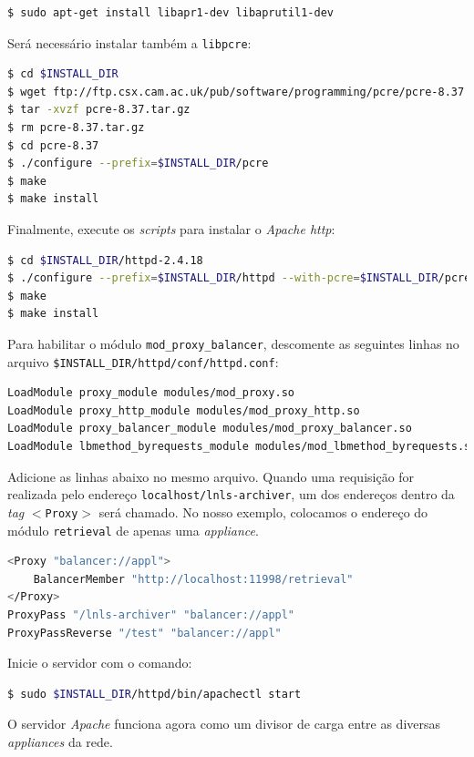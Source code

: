 \begin {enumerate}[i.]
\begin{lstlisting}[language=bash, style=nonumbers]
$ sudo apt-get install libapr1-dev libaprutil1-dev
\end{lstlisting}

Será necessário instalar também a \texttt{libpcre}:

\begin{lstlisting}[language=bash, style=nonumbers]
$ cd $INSTALL_DIR
$ wget ftp://ftp.csx.cam.ac.uk/pub/software/programming/pcre/pcre-8.37.tar.gz
$ tar -xvzf pcre-8.37.tar.gz
$ rm pcre-8.37.tar.gz
$ cd pcre-8.37
$ ./configure --prefix=$INSTALL_DIR/pcre
$ make
$ make install
\end{lstlisting}

Finalmente, execute os \textit{scripts} para instalar o \textit{Apache http}:

\begin{lstlisting}[language=bash, style=nonumbers]
$ cd $INSTALL_DIR/httpd-2.4.18
$ ./configure --prefix=$INSTALL_DIR/httpd --with-pcre=$INSTALL_DIR/pcre
$ make
$ make install
\end{lstlisting}

Para habilitar o módulo \texttt{mod\_proxy\_balancer}, descomente as seguintes
linhas no arquivo \texttt{\$INSTALL\_DIR/httpd/conf/httpd.conf}:

\begin{lstlisting}[language=bash, style=nonumbers]
LoadModule proxy_module modules/mod_proxy.so
LoadModule proxy_http_module modules/mod_proxy_http.so
LoadModule proxy_balancer_module modules/mod_proxy_balancer.so
LoadModule lbmethod_byrequests_module modules/mod_lbmethod_byrequests.so
\end{lstlisting}

Adicione as linhas abaixo no mesmo arquivo. Quando uma requisição for realizada
pelo endereço \texttt{localhost/lnls-archiver}, um dos endereços dentro da
\textit{tag} \texttt{\(<\)Proxy\(>\)} será chamado. No nosso exemplo, colocamos
o endereço do módulo \texttt{retrieval} de apenas uma \textit{appliance}.

\begin{lstlisting}[language=bash, style=nonumbers]
<Proxy "balancer://appl">
    BalancerMember "http://localhost:11998/retrieval"
</Proxy>
ProxyPass "/lnls-archiver" "balancer://appl"
ProxyPassReverse "/test" "balancer://appl"
\end{lstlisting}

Inicie o servidor com o comando:

\begin{lstlisting}[language=bash, style=nonumbers]
$ sudo $INSTALL_DIR/httpd/bin/apachectl start
\end{lstlisting}

O servidor \textit{Apache} funciona agora como um divisor de carga entre as
diversas \textit{appliances} da rede.

\end{enumerate} 

